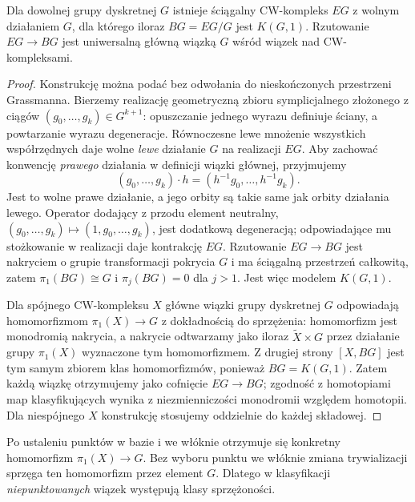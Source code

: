 \begin{twierdzenie}
\label{thm:bar-BG-v6}
Dla dowolnej grupy dyskretnej $G$ istnieje
ściągalny CW-kompleks $EG$ z wolnym działaniem $G$,
dla którego iloraz $BG=EG/G$ jest $K(G,1)$.
Rzutowanie $EG\to BG$ jest uniwersalną główną
wiązką $G$ wśród wiązek nad CW-kompleksami.
\end{twierdzenie}
\begin{proof}
Konstrukcję można podać bez odwołania do
nieskończonych przestrzeni Grassmanna. Bierzemy
realizację geometryczną zbioru symplicjalnego
złożonego z ciągów $(g_0,\ldots,g_k)\in G^{k+1}$:
opuszczanie jednego wyrazu definiuje ściany,
a powtarzanie wyrazu degeneracje. Równoczesne
lewe mnożenie wszystkich współrzędnych daje wolne
\emph{lewe} działanie $G$ na realizacji $EG$.
Aby zachować konwencję \emph{prawego} działania
w definicji wiązki głównej, przyjmujemy
\[
 (g_0,\ldots,g_k)\cdot h
   =(h^{-1}g_0,\ldots,h^{-1}g_k).
\]
Jest to wolne prawe działanie, a jego orbity są
takie same jak orbity działania lewego.
Operator dodający
z przodu element neutralny,
$(g_0,\ldots,g_k)\mapsto(1,g_0,\ldots,g_k)$,
jest dodatkową degeneracją; odpowiadające mu stożkowanie
w realizacji daje kontrakcję $EG$.
Rzutowanie $EG\to BG$ jest nakryciem o grupie
transformacji pokrycia $G$ i ma ściągalną przestrzeń
całkowitą, zatem $\pi_1(BG)\cong G$ i
$\pi_j(BG)=0$ dla $j>1$. Jest więc modelem $K(G,1)$.

Dla spójnego CW-kompleksu $X$ główne wiązki
grupy dyskretnej $G$ odpowiadają homomorfizmom
$\pi_1(X)\to G$ z dokładnością do sprzężenia:
homomorfizm jest monodromią nakrycia, a nakrycie
odtwarzamy jako iloraz $\widetilde X\times G$
przez działanie grupy $\pi_1(X)$ wyznaczone tym
homomorfizmem. Z drugiej strony
$[X,BG]$ jest tym samym zbiorem klas homomorfizmów,
ponieważ $BG=K(G,1)$. Zatem każdą wiązkę otrzymujemy
jako cofnięcie $EG\to BG$; zgodność z homotopiami
map klasyfikujących wynika z niezmienniczości
monodromii względem homotopii.
Dla niespójnego $X$ konstrukcję stosujemy oddzielnie
do każdej składowej.
\end{proof}

\begin{uwaga}
Po ustaleniu punktów w bazie i we włóknie otrzymuje się
konkretny homomorfizm $\pi_1(X)\to G$.
Bez wyboru punktu we włóknie zmiana trywializacji
sprzęga ten homomorfizm przez element $G$.
Dlatego w klasyfikacji \emph{niepunktowanych} wiązek
występują klasy sprzężoności.
\end{uwaga}

